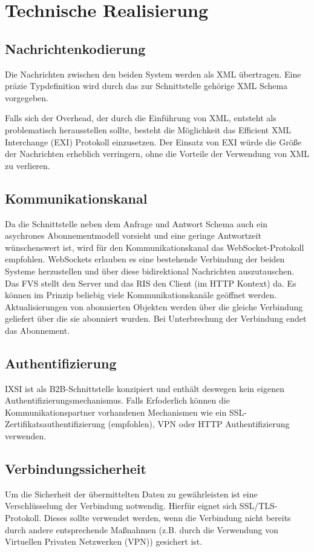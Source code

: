 \chapter{Technische Realisierung}
\label{sec:TechnischeRealisierung}


\section{Nachrichtenkodierung}
Die Nachrichten zwischen den beiden System werden als XML übertragen. Eine präzie Typdefinition wird durch das zur Schnittstelle gehörige XML Schema vorgegeben.

Falls sich der Overhead, der durch die Einführung von XML, entsteht als problematisch herausstellen sollte, besteht die Möglichkeit das Efficient XML Interchange (EXI) Protokoll einzusetzen. Der Einsatz von EXI würde die Größe der Nachrichten erheblich verringern, ohne die Vorteile der Verwendung von XML zu verlieren.

\section{Kommunikationskanal}
Da die Schnittstelle neben dem Anfrage und Antwort Schema auch ein asychrones Abonnementmodell vorsieht und eine geringe Antwortzeit wünschenswert ist, wird für den Kommunikationskanal das WebSocket-Protokoll empfohlen. WebSockets erlauben es eine bestehende Verbindung der beiden Systeme herzustellen und über diese bidirektional Nachrichten auszutauschen. Das FVS stellt den Server und das RIS den Client (im HTTP Kontext) da. Es können im Prinzip beliebig viele Kommunikationskanäle geöffnet werden. Aktualisierungen von abonnierten Objekten werden über die gleiche Verbindung geliefert über die sie abonniert wurden. Bei Unterbrechung der Verbindung endet das Abonnement.

\section{Authentifizierung}
IXSI ist als B2B-Schnittstelle konzipiert und enthält deswegen kein eigenen Authentifizierungsmechanismus. Falls Erfoderlich können die Kommunikationspartner vorhandenen Mechanismen wie ein SSL-Zertifikatsauthentifizierung (empfohlen), VPN oder HTTP Authentifizierung verwenden.

\section{Verbindungssicherheit}
Um die Sicherheit der übermittelten Daten zu gewährleisten ist eine Verschlüsselung der Verbindung notwendig. Hierfür eignet sich SSL/TLS-Protokoll. Dieses sollte verwendet werden, wenn die Verbindung nicht bereits durch andere entsprechende Maßnahmen (z.B. durch die Verwendung von Virtuellen Privaten Netzwerken (VPN)) gesichert ist.